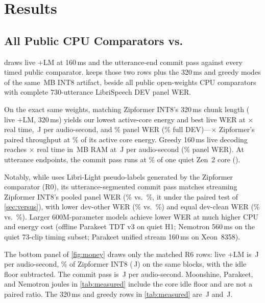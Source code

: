 \section{Results}\label{sec:results}

\subsection{All Public CPU Comparators vs.\ \ultra{}}\label{sec:compare}

 draws live +LM at 160\,ms and the utterance-end commit pass against every timed
public comparator.  keeps those two rows plus the 320\,ms and greedy modes of the
same \ColdHeadModel\,MB INT8 artifact, beside all \ColdCompleteCompCount{} public open-weights CPU comparators
with complete 730-utterance LibriSpeech DEV panel WER. \ColdHostSentence{} \ColdSubsetSentence{} \ColdOrderSentence{}

 \ColdHeadSentence{} On the exact same weights, matching
Zipformer INT8's 320\,ms chunk length (\ultra{} live +LM, 320\,ms) yields our lowest active-core energy
and best live WER at \VsWideSpeed$\times$ real time, \VsWideWatts\,J per audio-second, and \VsWideWer\%
panel WER (\CandLiveLmEightFullWer\% full DEV)---\VsWideSpeedX$\times$ Zipformer's paired throughput at
\VsWideEnergyPct\% of its active core energy. Greedy 160\,ms live decoding reaches \VsGreedySpeed$\times$
real time in \ColdRcTwoLiveGreedyRss\,MB RAM at \VsGreedyWatts\,J per audio-second (\VsGreedyWer\% panel
WER). At utterance endpoints, the commit pass runs at \ColdFinalCorePct\% of one quiet Zen~2 core
(\ColdFinalVsZipSpeed{}).

 \ColdAccuracySentence{} Notably, while \ultra{} uses Libri-Light pseudo-labels
generated by the Zipformer comparator (R0), its utterance-segmented commit pass matches streaming
Zipformer INT8's pooled panel WER (\ColdHeadWer\% vs.\ \ColdZipWer\%, \VsVerdictTwo{} it under the
paired test of \cref{sec:versus}), with lower dev-other WER (\ColdHeadWerOther\% vs.\ \ColdZipWerOther\%)
and equal dev-clean WER (\ColdHeadWerClean\% vs.\ \ColdZipWerClean\%). Larger 600M-parameter models
achieve lower WER at much higher CPU and energy cost (offline Parakeet TDT v3 on quiet H1; Nemotron
560\,ms on the quiet 73-clip timing subset; Parakeet unified stream 160\,ms on Xeon~8358).
\RelSubsetNote{}

 \ColdMemorySentence{} \ColdWattsSentence{} The bottom panel of
\cref{fig:money} draws only the matched R6 rows: live +LM is \ColdLiveWatts\,J per audio-second,
\VsEnergyPctOne\% of Zipformer INT8 (\ColdZipRsixWatts\,J) on the same blocks, with the idle floor
subtracted. The commit pass is \ColdHeadWatts\,J per audio-second. Moonshine, Parakeet, and Nemotron
joules in \cref{tab:measured} include the core idle floor and are not a paired ratio. The 320\,ms and
greedy rows in \cref{tab:measured} are \VsWideWatts\,J and \VsGreedyWatts\,J.

